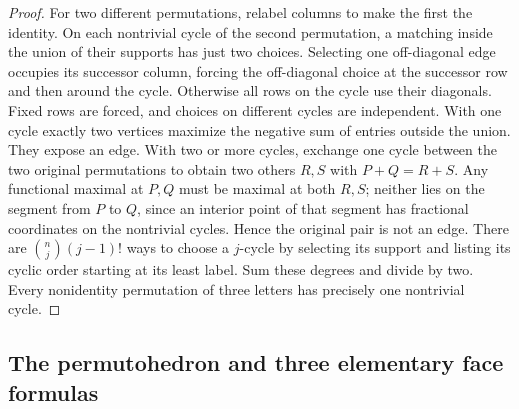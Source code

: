 \begin{proof}
For two different permutations, relabel columns to make the first the
identity. On each nontrivial cycle of the second permutation, a matching
inside the union of their supports has just two choices. Selecting one
off-diagonal edge occupies its successor column, forcing the off-diagonal
choice at the successor row and then around the cycle. Otherwise all
rows on the cycle use their diagonals. Fixed rows are forced, and
choices on different cycles are independent. With one cycle exactly
two vertices maximize the negative sum of entries outside the union.
They expose an edge. With two or more cycles, exchange one cycle between
the two original permutations to obtain two others \(R,S\) with
\(P+Q=R+S\). Any functional maximal at \(P,Q\) must be maximal at both
\(R,S\); neither lies on the segment from \(P\) to \(Q\), since an
interior point of that segment has fractional coordinates on the
nontrivial cycles. Hence the original pair is not an edge. There are
\(\binom nj(j-1)!\) ways to choose a \(j\)-cycle by selecting its support
and listing its cyclic order starting at its least label. Sum these
degrees and divide by two. Every nonidentity permutation of three
letters has precisely one nontrivial cycle.
\end{proof}

\subsection{The permutohedron and three elementary face formulas}

